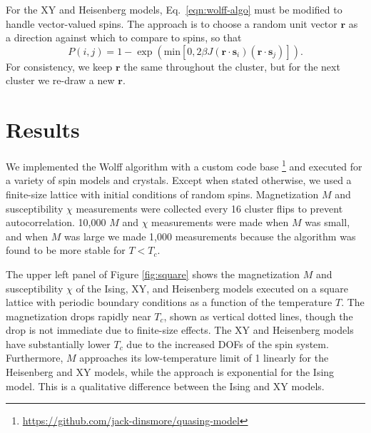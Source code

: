 \documentclass[
  amsmath,
  amssymb,
  aps,
  twocolumn,
  nofootinbib,
  nolongbibliography,
  floatfix,
]{revtex4-2}
\newcommand{\parens}[1]{\left ( #1 \right )}
\begin{document}
For the XY and Heisenberg models, Eq.~\ref{eqn:wolff-algo} must be modified to handle vector-valued spins. The approach is to choose a random unit vector $\bm r$ as a direction against which to compare to spins, so that
\begin{equation}
  P(i,j) = 1 - \exp\parens{\mathrm{min}\left[0, 2\beta J (\bm r \cdot \bm s_i)(\bm r \cdot \bm s_j) \right]}.
\end{equation}
For consistency, we keep $\bm r$ the same throughout the cluster, but for the next cluster we re-draw a new $\bm r$.


\section{Results}
\label{sec:results}

We implemented the Wolff algorithm with a custom code base \footnote{\url{https://github.com/jack-dinsmore/quasing-model}} and executed for a variety of spin models and crystals. Except when stated otherwise, we used a finite-size lattice with initial conditions of random spins. Magnetization $M$ and susceptibility $\chi$ measurements were collected every 16 cluster flips to prevent autocorrelation. 10,000 $M$ and $\chi$ measurements were made when $M$ was small, and when $M$ was large we made 1,000 measurements because the algorithm was found to be more stable for $T< T_c$.

The upper left panel of Figure \ref{fig:square} shows the magnetization $M$ and susceptibility $\chi$ of the Ising, XY, and Heisenberg models executed on a square lattice with periodic boundary conditions as a function of the temperature $T$. The magnetization drops rapidly near $T_c$, shown as vertical dotted lines, though the drop is not immediate due to finite-size effects. The XY and Heisenberg models have substantially lower $T_c$ due to the increased DOFs of the spin system. Furthermore, $M$ approaches its low-temperature limit of 1 linearly for the Heisenberg and XY models, while the approach is exponential for the Ising model. This is a qualitative difference between the Ising and XY models.
\end{document}
